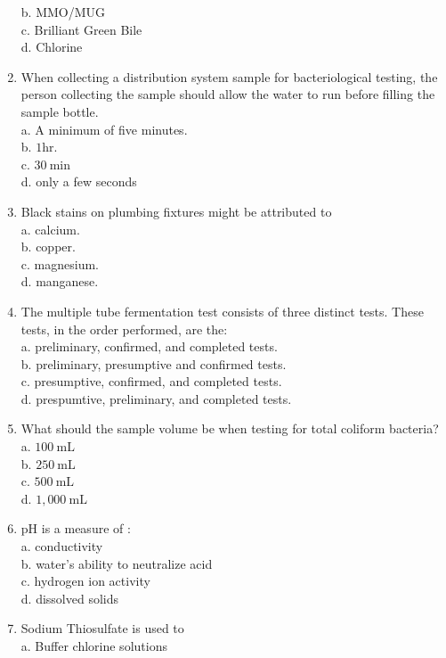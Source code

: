 \begin{enumerate}[1.]
b. MMO/MUG\\
c. Brilliant Green Bile \\
d. Chlorine\\
\item When collecting a distribution system sample for bacteriological testing, the person collecting the sample should allow the water to run before filling the sample bottle.\\
a. A minimum of five minutes.\\
b. $1 \mathrm{hr}$.\\
c. $30 \mathrm{~min}$\\
d. only a few seconds\\
\item Black stains on plumbing fixtures might be attributed to\\
a. calcium.\\
b. copper.\\
c. magnesium.\\
d. manganese.\\
\item The multiple tube fermentation test consists of three distinct tests. These tests, in the order performed, are the:\\
a. preliminary, confirmed, and completed tests.\\
b. preliminary, presumptive and confirmed tests.\\
c. presumptive, confirmed, and completed tests.\\
d. prespumtive, preliminary, and completed tests.\\
\item What should the sample volume be when testing for total coliform bacteria?\\
a. $100 \mathrm{~mL}$\\
b. $250 \mathrm{~mL}$\\
c. $500 \mathrm{~mL}$\\
d. $1,000 \mathrm{~mL}$\\
\item $\mathrm{pH}$ is a measure of :\\
a. conductivity\\
b. water's ability to neutralize acid\\
c. hydrogen ion activity\\
d. dissolved solids\\
\item Sodium Thiosulfate is used to\\
a. Buffer chlorine solutions\\

\end{enumerate}
